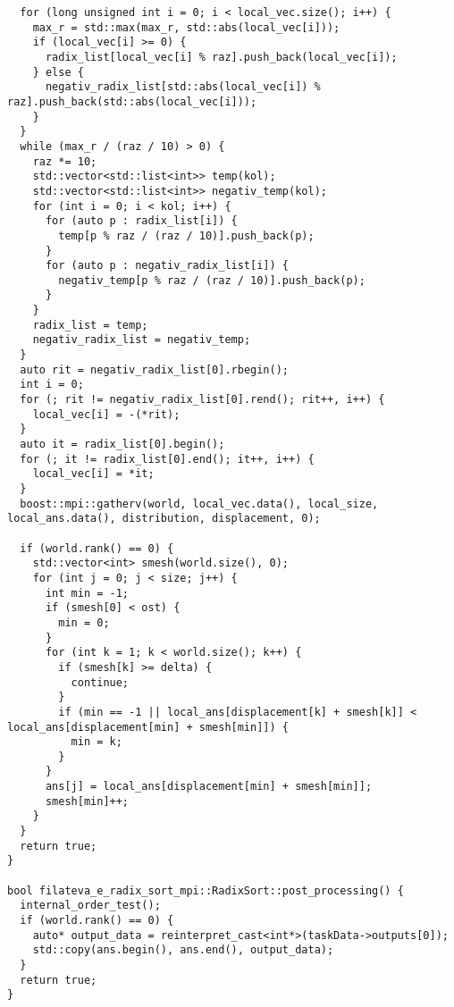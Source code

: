 \documentclass[a4paper, 14pt]{article}
\begin{document}
\begin{verbatim}
  for (long unsigned int i = 0; i < local_vec.size(); i++) {
    max_r = std::max(max_r, std::abs(local_vec[i]));
    if (local_vec[i] >= 0) {
      radix_list[local_vec[i] % raz].push_back(local_vec[i]);
    } else {
      negativ_radix_list[std::abs(local_vec[i]) % raz].push_back(std::abs(local_vec[i]));
    }
  }
  while (max_r / (raz / 10) > 0) {
    raz *= 10;
    std::vector<std::list<int>> temp(kol);
    std::vector<std::list<int>> negativ_temp(kol);
    for (int i = 0; i < kol; i++) {
      for (auto p : radix_list[i]) {
        temp[p % raz / (raz / 10)].push_back(p);
      }
      for (auto p : negativ_radix_list[i]) {
        negativ_temp[p % raz / (raz / 10)].push_back(p);
      }
    }
    radix_list = temp;
    negativ_radix_list = negativ_temp;
  }
  auto rit = negativ_radix_list[0].rbegin();
  int i = 0;
  for (; rit != negativ_radix_list[0].rend(); rit++, i++) {
    local_vec[i] = -(*rit);
  }
  auto it = radix_list[0].begin();
  for (; it != radix_list[0].end(); it++, i++) {
    local_vec[i] = *it;
  }
  boost::mpi::gatherv(world, local_vec.data(), local_size, local_ans.data(), distribution, displacement, 0);

  if (world.rank() == 0) {
    std::vector<int> smesh(world.size(), 0);
    for (int j = 0; j < size; j++) {
      int min = -1;
      if (smesh[0] < ost) {
        min = 0;
      }
      for (int k = 1; k < world.size(); k++) {
        if (smesh[k] >= delta) {
          continue;
        }
        if (min == -1 || local_ans[displacement[k] + smesh[k]] < local_ans[displacement[min] + smesh[min]]) {
          min = k;
        }
      }
      ans[j] = local_ans[displacement[min] + smesh[min]];
      smesh[min]++;
    }
  }
  return true;
}

bool filateva_e_radix_sort_mpi::RadixSort::post_processing() {
  internal_order_test();
  if (world.rank() == 0) {
    auto* output_data = reinterpret_cast<int*>(taskData->outputs[0]);
    std::copy(ans.begin(), ans.end(), output_data);
  }
  return true;
}


	\end{verbatim}
    
\end{document}
